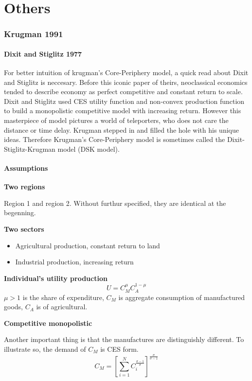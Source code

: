 \documentclass{article}
\numberwithin{equation}{section} %
\begin{document}
%
%
%
\part{Others}
\section{Krugman 1991} %
\label{sec:krugman_1991}
\subsection{Dixit and Stiglitz 1977} %
\label{sub:dixit_and_stiglitz}
For better intuition of krugman's Core-Periphery model, a quick read about Dixit and Stiglitz is neccesary. Before this iconic paper of theirs, neoclassical economics tended to describe economy as perfect competitive and constant return to scale. Dixit and Stiglitz used CES utility function and non-convex production function to build a monopolistic competitive model with increasing return. However this masterpiece of model pictures a world of teleporters, who does not care the distance or time delay. Krugman stepped in and filled the hole with his unique ideas. Therefore Krugman's Core-Periphery model is sometimes called the Dixit-Stiglitz-Krugman model (DSK model).
\subsection{Assumptions} %
\label{sub:assumptions}
\textbf{Two regions}

Region 1 and region 2. Without furthur specified, they are identical at the begenning.

\textbf{Two sectors}
\begin{itemize}
  \item Agricultural production, constant return to land
  \item Industrial production, increasing return
\end{itemize}

\textbf{Individual's utility production}
\begin{equation}
  U=C^\mu_M C^{1-\mu}_A
\end{equation}
$\mu > 1$ is the share of expenditure, $C_M$ is aggregate consumption of manufactured goods, $C_A$ is of agricultural.

\textbf{Competitive monopolistic}

Another important thing is that the manufactures are distinguishly different. To illustrate so, the demand of $C_M$ is CES form.
\begin{equation}
  C_M=[\sum\limits_{i=1}^{N}C_i^{\frac{\sigma-1}{\sigma}}]^{\frac{\sigma}{\sigma-1}}
\end{equation}
\end{document}
